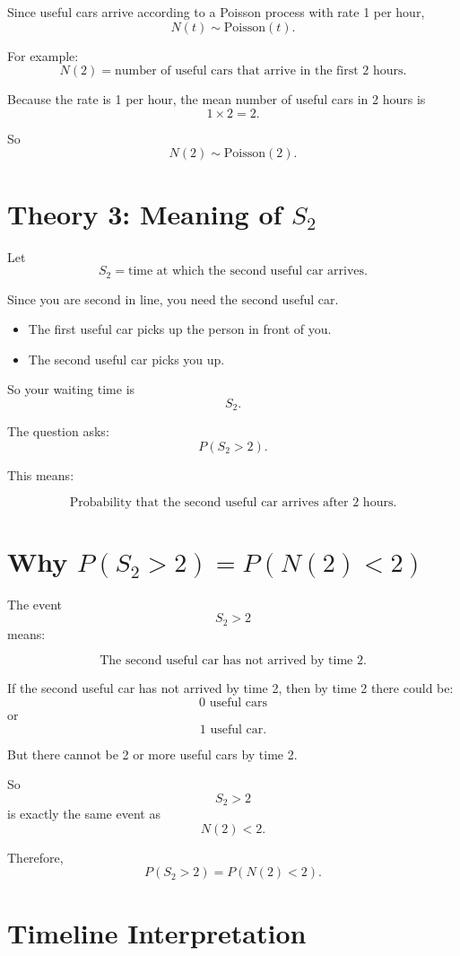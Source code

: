 \documentclass[12pt]{article}
\begin{document}
Since useful cars arrive according to a Poisson process with rate 1 per hour,
\[
N(t)\sim \text{Poisson}(t).
\]

For example:
\[
N(2)=\text{number of useful cars that arrive in the first 2 hours}.
\]

Because the rate is 1 per hour, the mean number of useful cars in 2 hours is
\[
1\times 2=2.
\]

So
\[
\boxed{N(2)\sim \text{Poisson}(2).}
\]

\section*{Theory 3: Meaning of \(S_2\)}

Let
\[
S_2=\text{time at which the second useful car arrives}.
\]

Since you are second in line, you need the second useful car.

\begin{itemize}
    \item The first useful car picks up the person in front of you.
    \item The second useful car picks you up.
\end{itemize}

So your waiting time is
\[
S_2.
\]

The question asks:
\[
P(S_2>2).
\]

This means:

\[
\text{Probability that the second useful car arrives after 2 hours.}
\]

\section*{Why \(P(S_2>2)=P(N(2)<2)\)}

The event
\[
S_2>2
\]
means:

\[
\text{The second useful car has not arrived by time 2.}
\]

If the second useful car has not arrived by time 2, then by time 2 there could be:
\[
0 \text{ useful cars}
\]
or
\[
1 \text{ useful car}.
\]

But there cannot be 2 or more useful cars by time 2.

So
\[
S_2>2
\]
is exactly the same event as
\[
N(2)<2.
\]

Therefore,
\[
\boxed{P(S_2>2)=P(N(2)<2).}
\]

\section*{Timeline Interpretation}
\end{document}
